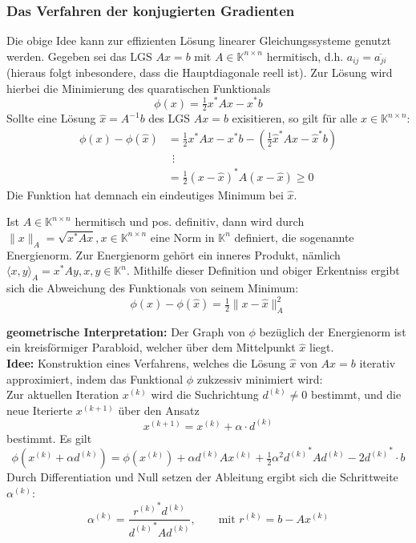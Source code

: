 \documentclass{article}
\begin{document}
\subsubsection{Das Verfahren der konjugierten Gradienten}
Die obige Idee kann zur effizienten Lösung linearer Gleichungssysteme genutzt werden.
Gegeben sei das LGS $Ax=b$ mit $A\in\mathbb{K}^{n\times n}$ hermitisch, 
d.h. $a_{ij}=\overline{a_{ji}}$ (hieraus folgt inbesondere, dass die Hauptdiagonale reell ist). 
Zur Lösung wird hierbei die Minimierung des quaratischen Funktionals 
\[\phi(x)=\tfrac{1}{2}x^* Ax - x^*b\]
Sollte eine Lösung $\hat{x}=A^{-1}b$ des LGS $Ax=b$ exisitieren, so gilt für alle $x\in\mathbb{K}^{n\times n}$:
\begin{align*}
    \phi(x)-\phi(\hat{x}) &= \tfrac{1}{2}x^* Ax - x^*b - (\tfrac{1}{2}\hat{x}^* A\hat{x} - \hat{x}^*b) \\
    &\ \ \vdots \\
    &= \tfrac{1}{2} (x-\hat{x})^*A(x-\hat{x}) \geq 0
\end{align*}
Die Funktion hat demnach ein eindeutiges Minimum bei $\hat{x}$.
\begin{defbox}
    Ist $A\in\mathbb{K}^{n\times n}$ hermitisch und pos. definitiv, dann wird durch $\|x\|_A=\sqrt{x^*Ax}, 
    x\in\mathbb{K}^{n\times n}$ eine Norm in $\mathbb{K}^n$ definiert, die sogenannte Energienorm. 
    Zur Energienorm gehört ein inneres Produkt, nämlich $\langle x,y\rangle_A=x^*Ay, x,y\in\mathbb{K}^n$.
    Mithilfe dieser Definition und obiger Erkentniss ergibt sich die Abweichung des Funktionals von seinem Minimum:
    \[\phi(x)-\phi(\hat{x}) = \tfrac{1}{2}\|x-\hat{x}\|^2_A\]
\end{defbox}
\textbf{geometrische Interpretation:} Der Graph von $\phi$ bezüglich der Energienorm ist ein kreisförmiger Parabloid, 
welcher über dem Mittelpunkt $\hat{x}$ liegt. \\
\textbf{Idee:} Konstruktion eines Verfahrens, welches die Lösung $\hat{x}$ von $Ax=b$ iterativ approximiert, 
indem das Funktional $\phi$ zukzessiv minimiert wird: \\
Zur aktuellen Iteration $x^{(k)}$ wird die Suchrichtung $d^{(k)}\neq 0$ bestimmt, und die neue Iterierte 
$x^{(k+1)}$ über den Ansatz 
\[x^{(k+1)} = x^{(k)} + \alpha\cdot d^{(k)} \tag{3}\]
bestimmt. Es gilt
\[\phi(x^{(k)}+\alpha d^{(k)}) = \phi(x^{(k)}) + \alpha d^{(k)}A x^{(k)} + 
\tfrac{1}{2}\alpha^2 {d^{(k)}}^*Ad^{(k)}-2{d^{(k)}}^*\cdot b \tag{4}\]
Durch Differentiation und Null setzen der Ableitung ergibt sich die Schrittweite $\alpha^{(k)}$:
\[\alpha^{(k)}=\dfrac{{r^{(k)}}^* d^{(k)}}{{d^{(k)}}^* A d^{(k)}},\qquad \text{mit } r^{(k)}=b-Ax^{(k)} \tag{5}\]
\end{document}
